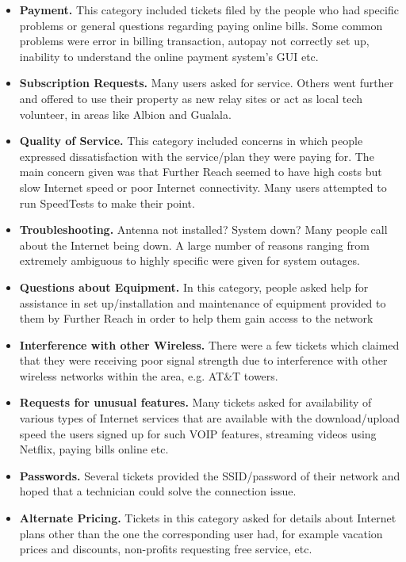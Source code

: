 \begin{itemize}
\item \textbf{Payment.} This category included tickets filed by the people who had specific problems or general questions regarding paying online bills. Some common problems were error in billing transaction, autopay not correctly set up, inability to understand the online payment system’s GUI etc.
\item \textbf{Subscription Requests.} Many users asked for service. Others
went further and offered to use their property as new relay
  sites or act as local tech volunteer, in areas like Albion and Gualala. %
\item \textbf{Quality of Service.} This category included concerns in which people expressed dissatisfaction with the service/plan they were paying for. 
The main concern given was that Further Reach seemed to have high costs but slow Internet speed or poor Internet
connectivity. Many users attempted to run SpeedTests to make their point.
\item \textbf{Troubleshooting.} Antenna not installed? System down? Many people call
  about the Internet being down. A large number of reasons ranging from extremely ambiguous to highly specific were given for system outages.
\item \textbf{Questions about Equipment.} In this category, people asked help for assistance in set up/installation and maintenance of equipment provided to them by Further Reach in order to help them gain access to the network
\item \textbf{Interference with other Wireless.} There were a few tickets which claimed
that they were receiving poor signal strength due to interference with other
wireless networks within the area, e.g. AT\&T towers.
\item \textbf{Requests for unusual features.} Many tickets asked for availability of various types of Internet services that are available with the download/upload speed the users signed up for such VOIP features, streaming videos using Netflix, paying bills online etc.
\item \textbf{Passwords.} Several tickets provided the SSID/password of their
network and hoped that a technician could solve the connection issue.
\item \textbf{Alternate Pricing.} Tickets in this category asked for details about
Internet plans other than the one the corresponding user had, for example
vacation prices and discounts, non-profits requesting free service, etc.
\end{itemize}

